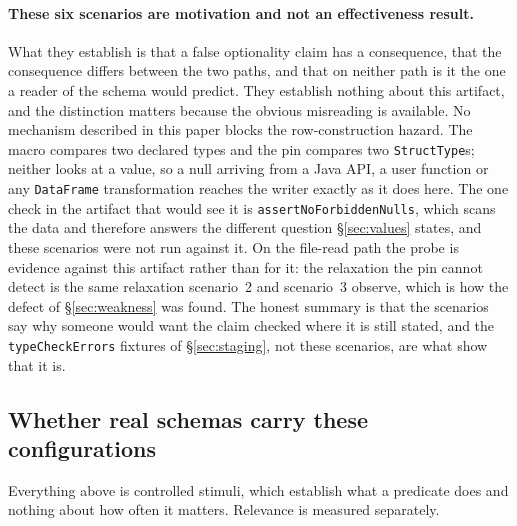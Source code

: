 \paragraph{These six scenarios are motivation and not an effectiveness result.} What they establish is that a false optionality claim has a consequence, that the consequence differs between the two paths, and that on neither path is it the one a reader of the schema would predict. They establish nothing about this artifact, and the distinction matters because the obvious misreading is available. No mechanism described in this paper blocks the row-construction hazard. The macro compares two declared types and the pin compares two \texttt{StructType}s; neither looks at a value, so a null arriving from a Java API, a user function or any \texttt{DataFrame} transformation reaches the writer exactly as it does here. The one check in the artifact that would see it is \texttt{assertNoForbiddenNulls}, which scans the data and therefore answers the different question \S\ref{sec:values} states, and these scenarios were not run against it. On the file-read path the probe is evidence against this artifact rather than for it: the relaxation the pin cannot detect is the same relaxation scenario~2 and scenario~3 observe, which is how the defect of \S\ref{sec:weakness} was found. The honest summary is that the scenarios say why someone would want the claim checked where it is still stated, and the \texttt{typeCheckErrors} fixtures of \S\ref{sec:staging}, not these scenarios, are what show that it is.

\subsection{Whether real schemas carry these configurations}

Everything above is controlled stimuli, which establish what a predicate does and nothing about how often it matters. Relevance is measured separately.

